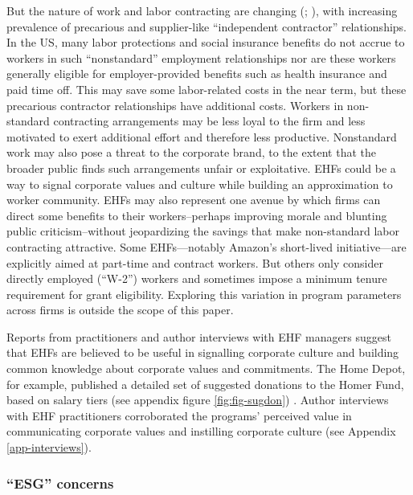 \documentclass[
  11pt,
  oneside]{article}
\begin{document}
But the nature of work and labor contracting are changing (; ), with increasing prevalence of precarious and supplier-like ``independent contractor'' relationships. In the US, many labor protections and social insurance benefits do not accrue to workers in such ``nonstandard'' employment relationships nor are these workers generally eligible for employer-provided benefits such as health insurance and paid time off. This may save some labor-related costs in the near term, but these precarious contractor relationships have additional costs. Workers in non-standard contracting arrangements may be less loyal to the firm and less motivated to exert additional effort and therefore less productive. Nonstandard work may also pose a threat to the corporate brand, to the extent that the broader public finds such arrangements unfair or exploitative. EHFs could be a way to signal corporate values and culture while building an approximation to worker community. EHFs may also represent one avenue by which firms can direct some benefits to their workers--perhaps improving morale and blunting public criticism--without jeopardizing the savings that make non-standard labor contracting attractive. Some EHFs---notably Amazon's short-lived initiative---are explicitly aimed at part-time and contract workers. But others only consider directly employed (``W-2'') workers and sometimes impose a minimum tenure requirement for grant eligibility. Exploring this variation in program parameters across firms is outside the scope of this paper.

Reports from practitioners and author interviews with EHF managers suggest that EHFs are believed to be useful in signalling corporate culture and building common knowledge about corporate values and commitments. The Home Depot, for example, published a detailed set of suggested donations to the Homer Fund, based on salary tiers (see appendix figure \ref{fig:fig-sugdon}) . Author interviews with EHF practitioners corroborated the programs' perceived value in communicating corporate values and instilling corporate culture (see Appendix \ref{app-interviews}).

\subsubsection{``ESG'' concerns}\label{esg-concerns}
\end{document}
